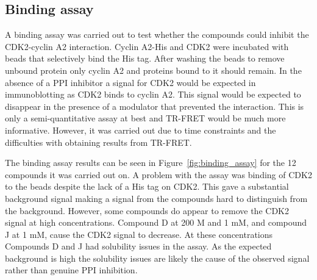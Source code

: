 \begin{figure}


\end{figure}


\subsection{Binding assay}

A binding assay was carried out to test whether the compounds could inhibit the CDK2-cyclin A2 interaction.
Cyclin A2-His and CDK2 were incubated with beads that selectively bind the His tag.
After washing the beads to remove unbound protein only cyclin A2 and proteins bound to it should remain.
In the absence of a PPI inhibitor a signal for CDK2 would be expected in immunoblotting as CDK2 binds to cyclin A2.
This signal would be expected to disappear in the presence of a modulator that prevented the interaction.
This is only a semi-quantitative assay at best and TR-FRET would be much more informative.
However, it was carried out due to time constraints and the difficulties with obtaining results from TR-FRET.

The binding assay results can be seen in Figure~\ref{fig:binding_assay} for the 12 compounds it was carried out on.
A problem with the assay was binding of CDK2 to the beads despite the lack of a His tag on CDK2.
This gave a substantial background signal making a signal from the compounds hard to distinguish from the background.
However, some compounds do appear to remove the CDK2 signal at high concentrations.
Compound D at 200 \textmu M and 1 mM, and compound J at 1 mM, cause the CDK2 signal to decrease.
At these concentrations Compounds D and J had solubility issues in the assay.
As the expected background is high the solubility issues are likely the cause of the observed signal rather than genuine PPI inhibition.


